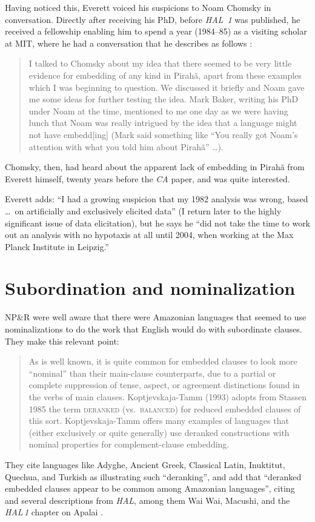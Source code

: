 \documentclass[output=paper,colorlinks,citecolor=brown
]{langscibook}
\begin{document}
Having noticed this, Everett voiced his suspicions to Noam Chomsky in
conversation. Directly after receiving his PhD, before \textit{HAL~1}
was published, he received a fellowship enabling him to spend a year
(1984--85) as a visiting scholar at MIT, where he had a conversation
that he describes as follows \citep[12, fn.\,7]{Everett07}:
\begin{quote}
I talked to Chomsky about my idea that there seemed to be very
little evidence for embedding of any kind in Pirahã, apart from
these \mbox{} examples which I was beginning to question.
We discussed it briefly and Noam gave me some ideas for further
testing the idea. Mark Baker, writing his PhD under Noam at
the time, mentioned to me one day as we were having lunch that Noam
was really intrigued by the idea that a language might not have
embedd[ing] (Mark said something like ``You really got Noam's
attention with what you told him about Pirah{\~a}'' \ldots).
\end{quote}
Chomsky, then, had heard about the apparent lack of embedding in
Pirah{\~a} from Everett himself, twenty years before the \textit{CA}
paper, and was quite interested.

Everett adds: ``I had a growing suspicion that my 1982 analysis was
wrong, based \ldots\ on artificially and exclusively elicited data''
(I return later to the highly significant issue of data elicitation),
but he says he ``did not take the time to work out an analysis with
no hypotaxis at all until 2004, when working at the Max Planck
Institute in Leipzig.''

\section{Subordination and nominalization}

NP\&R were well aware that there were Amazonian languages that seemed
to use nominalizations to do the work that English would do with
subordinate clauses. They make this relevant point:
\begin{quote}
As is well known, it is quite common for embedded clauses to look
more ``nominal'' than their main-clause counterparts, due to a partial
or complete suppression of tense, aspect, or agreement distinctions
found in the verbs of main clauses. Koptjevskaja-Tamm (1993) adopts
from Stassen 1985 the term \textsc{deranked} (vs.\ \textsc{balanced})
for reduced embedded clauses of this sort. Koptjevskaja-Tamm offers
many examples of languages that (either exclusively or quite generally)
use deranked constructions with nominal properties for complement-clause
embedding.
\citep[370]{NevPesRod09a}
\end{quote}
They cite languages like Adyghe, Ancient Greek, Classical Latin, Inuktitut,
Quechua, and Turkish as illustrating such ``deranking'', and add that
``deranked embedded clauses appear to be common among Amazonian languages'',
citing \citet{Derbyshire87} and several descriptions from \textit{HAL},
among them Wai Wai, Macushi, and the \textit{HAL\,1} chapter on Apalai
\citep{Koehn86}.
\end{document}
